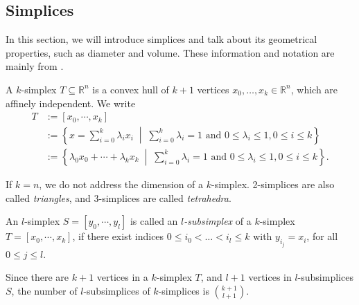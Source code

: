     \subsection{Simplices}
    In this section, we will introduce simplices and talk about its geometrical properties, such as diameter and volume. These information and notation are mainly from \cite{ciarlet2002finite}\cite{bey2000simplicial}.
    \noindent
    \begin{definition}
    A $k$-simplex $T \subseteq\mathbb{R}^n$ is a convex hull of $k+1$ vertices ${x}_0, \ldots, {x}_k \in \mathbb{R}^n$, which are affinely independent. We write 
    \begin{equation*}
    \begin{split}
    {T} & := [{x}_0, \cdots, {x}_k ]\\
    & := \left\{{x} = \sum\limits_{i=0}^k \lambda_i {x}_i \;\middle|\; \sum\limits_{i=0}^k \lambda_i = 1 \text{ and } 0 \leqslant \lambda_i \leqslant 1, 0 \leqslant i \leqslant k \right\}\\
    & := \left\{\lambda_0{x}_0 + \cdots + \lambda_k{x}_k \;\middle|\; \sum\limits_{i=0}^k \lambda_i = 1 \text{ and } 0 \leqslant \lambda_i \leqslant 1, 0 \leqslant i \leqslant k \right\}.
    \end{split}
    \end{equation*}
    \end{definition}
    If $k = n$, we do not address the dimension of a $k$-simplex. 2-simplices are also called \emph{triangles}, and 3-simplices are called \emph{tetrahedra}.

    \begin{definition}
    An  $l$-simplex ${S} = [{y}_0, \cdots, {y}_l]$ is called an \emph{$l$-subsimplex} of a $k$-simplex ${T} = [{x}_0, \cdots, {x}_k]$, if there exist indices $0 \leqslant {i}_0 < \ldots< {i}_l \leqslant k$ with ${y}_{i_{j}} = {x}_i$, for all $0 \leqslant j \leqslant l$.
    \end{definition}
    Since there are $k+1$ vertices in a $k$-simplex $T$, and $l+1$ vertices in $l$-subsimplices $S$, the number of $l$-subsimplices of $k$-simplices is $\binom{k+1}{l+1}$.



